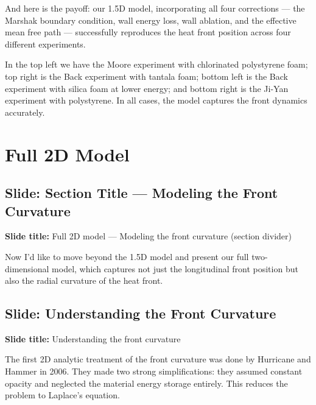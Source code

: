 \documentclass[12pt, a4paper]{article}
\begin{document}
And here is the payoff: our 1.5D model, incorporating all four corrections --- the Marshak boundary condition, wall energy loss, wall ablation, and the effective mean free path --- successfully reproduces the heat front position across four different experiments.

In the top left we have the Moore experiment with chlorinated polystyrene foam; top right is the Back experiment with tantala foam; bottom left is the Back experiment with silica foam at lower energy; and bottom right is the Ji-Yan experiment with polystyrene. In all cases, the model captures the front dynamics accurately.

\section{Full 2D Model}

\subsection{Slide: Section Title --- Modeling the Front Curvature}

\begin{slidebox}
\textbf{Slide title:} Full 2D model --- Modeling the front curvature (section divider)
\end{slidebox}

Now I'd like to move beyond the 1.5D model and present our full two-dimensional model, which captures not just the longitudinal front position but also the radial curvature of the heat front.

\subsection{Slide: Understanding the Front Curvature}

\begin{slidebox}
\textbf{Slide title:} Understanding the front curvature
\end{slidebox}

The first 2D analytic treatment of the front curvature was done by Hurricane and Hammer in 2006. They made two strong simplifications: they assumed constant opacity and neglected the material energy storage entirely. This reduces the problem to Laplace's equation.
\end{document}
